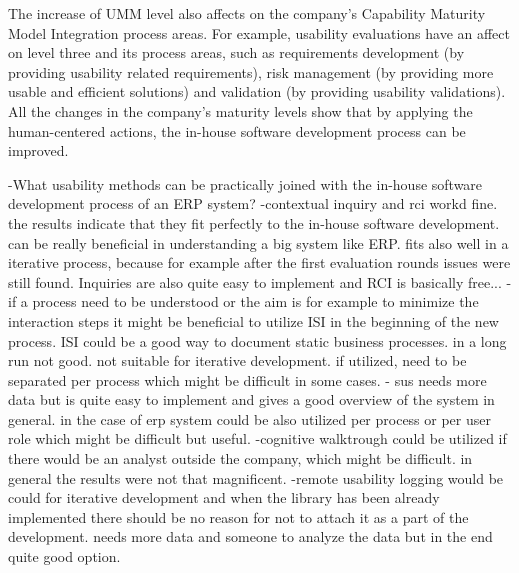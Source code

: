 \documentclass[12pt,a4paper,oneside,pdftex]{report}
\begin{document}
The increase of UMM level also affects on the company's Capability Maturity Model Integration process areas. For example, usability evaluations have an affect on level three and its process areas, such as requirements development (by providing usability related requirements), risk management (by providing more usable and efficient solutions) and validation (by providing usability validations). All the changes in the company's maturity levels show that by applying the human-centered actions, the in-house software development process can be improved.

-What usability methods can be practically joined with the in-house software development process of an ERP system?
-contextual inquiry and rci workd fine. the results indicate that they fit perfectly to the in-house software development. can be really beneficial in understanding a big system like ERP. fits also well in a iterative process, because for example after the first evaluation rounds issues were still found. Inquiries are also quite easy to implement and RCI is basically free...
-if a process need to be understood or the aim is for example to minimize the interaction steps  it might be beneficial to utilize ISI in the beginning of the new process. ISI could be a good way to document static business processes. in a long run not good. not suitable for iterative development. if utilized, need to be separated per process which might be difficult in some cases.
- sus needs more data but is quite easy to implement and gives a good overview of the system in general. in the case of erp system could be also utilized per process or per user role which might be difficult but useful.
-cognitive walktrough could be utilized if there would be an analyst outside the company, which might be difficult. in general the results were not that magnificent.
-remote usability logging would be could for iterative development and when the library has been already implemented there should be no reason for not to attach it as a part of the development. needs more data and someone to analyze the data but in the end quite good option.




    
\end{document}

